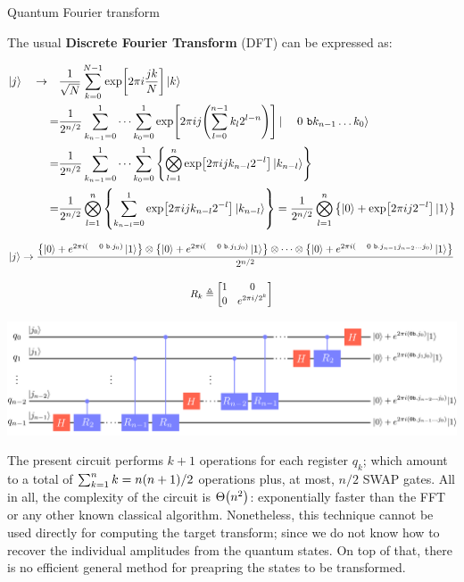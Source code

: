 \documentclass[9pt, handout, aspectratio=169]{beamer}	%
\begin{document}
\begin{frame}[allowframebreaks]{Quantum Fourier transform}

	The usual \textbf{Discrete Fourier Transform} (DFT) can be expressed as:

	\medskip

	\begin{align*}
	  \ket{j} \qra&
				\frac{1}{\sqrt{N}} \sum_{k=0}^{N-1} \exp[2\pi i \frac{jk}{N}] \ket{k} \\
	    =& \frac{1}{2^{n/2}} \sum_{k_{n-1}=0}^{1} \cdots \sum_{k_{0}=0}^{1}
	      \exp[2\pi ij \qty(\sum_{l=0}^{n-1} k_{l} 2^{l-n})]
	      \ket{\bin k_{n-1} \dots k_{0}} \\
	    =& \frac{1}{2^{n/2}} \sum_{k_{n-1}=0}^{1} \cdots \sum_{k_{0}=0}^{1}
	      \qty{ \bigotimes_{l=1}^{n} \exp[2\pi ij k_{n-l} 2^{-l}]
	      \ket{k_{n-l}} } \\
	    =& \frac{1}{2^{n/2}} \bigotimes_{l=1}^{n}
	      \qty{ \sum_{k_{n-l}=0}^{1} \exp[2\pi ij k_{n-l} 2^{-l}] \ket{k_{n-l}} }
	    = \frac{1}{2^{n/2}} \bigotimes_{l=1}^{n}
	      \qty{ \ket{0} + \exp[2\pi ij 2^{-l}] \ket{1} }
	\end{align*}

\break

	\begin{gather*}
		\ket{j} \ra
			\frac{
				\qty{\ket{0}+ e^{2\pi i \qty(\bin.j_{0})} \ket{1}} \otimes
				\qty{\ket{0}+ e^{2\pi i \qty(\bin.j_{1}j_{0})} \ket{1}} \otimes
				\cdots \otimes
				\qty{\ket{0} + e^{2\pi i \qty(\bin.j_{n-1}j_{n-2} \dots j_{0})} \ket{1}}
			}{2^{n/2}} \\[10pt]
		R_{k} \defeq \mqty[1 & 0 \\ 0 & e^{2\pi i/2^k}]
	\end{gather*}

	\vspace{-2em}

	\begin{center}
		\includegraphics[width=.80\paperwidth]{Figures/quantum-background/quantum-fourier-transform}
	\end{center}

\break

	The present circuit performs $k+1$ operations for each register $q_k$; which amount to a total of $\sum_{k=1}^{n}k=n\qty(n+1)/2$ operations plus, at most, $n/2$ SWAP gates. All in all, the complexity of the circuit is $\Theta\qty(n^2)$: exponentially faster than the FFT or any other known classical algorithm. Nonetheless, this technique cannot be used directly for computing the target transform; since we do not know how to recover the individual amplitudes from the quantum states. On top of that, there is no efficient general method for preapring the states to be transformed.


\end{frame}
\end{document}

